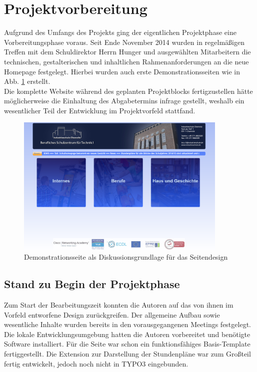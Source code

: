 \section{Projektvorbereitung} 
\label{sec:Projektvorbereitung}
Aufgrund des Umfangs des Projekts ging der eigentlichen Projektphase eine Vorbereitungsphase
voraus. Seit Ende November 2014 wurden in regelm\"a\ss{}igen Treffen mit dem Schuldirektor Herrn Hunger 
und ausgew\"ahlten Mitarbeitern die technischen, gestalterischen und inhaltlichen Rahmenanforderungen 
an die neue Homepage festgelegt. Hierbei wurden auch erste Demonstrationsseiten wie
in Abb. \ref{fig:demoSite} erstellt.\\
Die komplette Website w\"ahrend des geplanten Projektblocks fertigzustellen h\"atte m\"oglicherweise
die Einhaltung des Abgabetermins infrage gestellt, weshalb ein wesentlicher Teil der Entwicklung im 
Projektvorfeld stattfand.\\

\begin{figure}[ht]
	\includegraphics[width=0.9\textwidth]{./Bilder/entwurf_johannes}
	\centering
	\caption{Demonstrationsseite als Diskussionsgrundlage f\"ur das Seitendesign}
	\label{fig:demoSite}
\end{figure}

\subsection{Stand zu Begin der Projektphase}
\label{sec:StandZuBeginDerProjektphase}
Zum Start der Bearbeitungszeit konnten die Autoren auf das von ihnen im Vorfeld entworfene Design 
zur\"uckgreifen. Der allgemeine Aufbau sowie wesentliche Inhalte wurden bereits in den vorausgegangenen 
Meetings festgelegt.\\
Die lokale Entwicklungsumgebung hatten die Autoren vorbereitet und ben\"otigte Software installiert. 
F\"ur die Seite war schon ein funktionsf\"ahiges Basis-Template fertiggestellt. Die Extension zur 
Darstellung der Stundenpl\"ane war zum Gro\ss{}teil fertig entwickelt, jedoch noch nicht in TYPO3 eingebunden.

